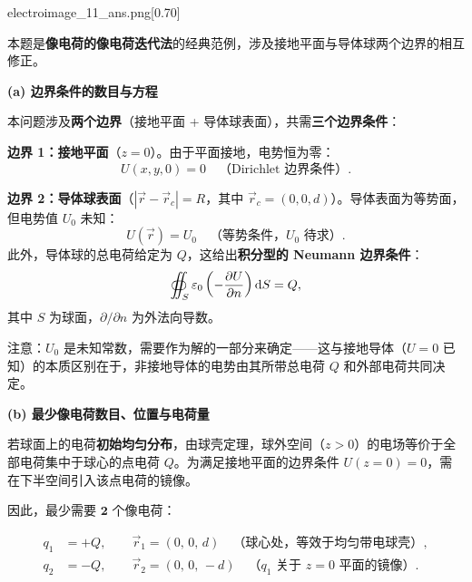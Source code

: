 \begin{solution}
    \label{solution_ei_1}
    \begin{singlefigure}[]{electroimage_11_ans.png}[0.70]
    \end{singlefigure}
    本题是\textbf{像电荷的像电荷迭代法}的经典范例，涉及接地平面与导体球两个边界的相互修正。
    
    \medskip

    \textbf{(a) 边界条件的数目与方程}

    本问题涉及\textbf{两个边界}（接地平面 + 导体球表面），共需\textbf{三个边界条件}：

    \begin{Itemize}
        \item \textbf{边界 1：接地平面}（$z=0$）。由于平面接地，电势恒为零：
        \[
            U(x,y,0) = 0 \quad \text{（Dirichlet 边界条件）}.
        \]
        \item \textbf{边界 2：导体球表面}（$|\vec{r} - \vec{r}_c| = R$，其中 $\vec{r}_c = (0,0,d)$）。导体表面为等势面，但电势值 $U_0$ 未知：
        \[
            U(\vec{r}) = U_0 \quad \text{（等势条件，$U_0$ 待求）}.
        \]
        此外，导体球的总电荷给定为 $Q$，这给出\textbf{积分型的 Neumann 边界条件}：
        \[
            \oiint_{S} \varepsilon_0 \left(-\frac{\partial U}{\partial n}\right) \dif S = Q,
        \]
        其中 $S$ 为球面，$\partial/\partial n$ 为外法向导数。
    \end{Itemize}

    注意：$U_0$ 是未知常数，需要作为解的一部分来确定——这与接地导体（$U=0$ 已知）的本质区别在于，非接地导体的电势由其所带总电荷 $Q$ 和外部电荷共同决定。

    \medskip

    \textbf{(b) 最少像电荷数目、位置与电荷量}

    若球面上的电荷\textbf{初始均匀分布}，由球壳定理，球外空间（$z>0$）的电场等价于全部电荷集中于球心的点电荷 $Q$。为满足接地平面的边界条件 $U(z=0)=0$，需在下半空间引入该点电荷的镜像。

    因此，最少需要 $\bm{2}$ 个像电荷：

    \[
        \begin{aligned}
            q_1 & = +Q, \qquad \vec{r}_1 = (0,\,0,\,d) \quad \text{（球心处，等效于均匀带电球壳）},         \\[4pt]
            q_2 & = -Q, \qquad \vec{r}_2 = (0,\,0,\,-d) \quad \text{（$q_1$ 关于 $z=0$ 平面的镜像）}.
        \end{aligned}
    \]


\end{solution}
